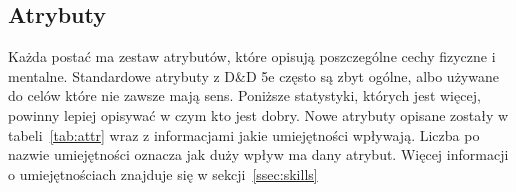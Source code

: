 \subsection{Atrybuty}
\label{ssec:attribs}

Każda postać ma zestaw atrybutów, które opisują poszczególne cechy fizyczne i
mentalne. Standardowe atrybuty z D\&D 5e często są zbyt ogólne, albo używane do
celów które nie zawsze mają sens. Poniższe statystyki, których jest więcej,
powinny lepiej opisywać w czym kto jest dobry.  Nowe atrybuty opisane zostały w
tabeli~\ref{tab:attr} wraz z informacjami jakie umiejętności wpływają. Liczba po
nazwie umiejętności oznacza jak duży wpływ ma dany atrybut. Więcej informacji o
umiejętnościach znajduje się w sekcji~\ref{ssec:skills}


\begin{longtable}[c]{m{}m{}m{}}
	\toprule


\end{longtable}
